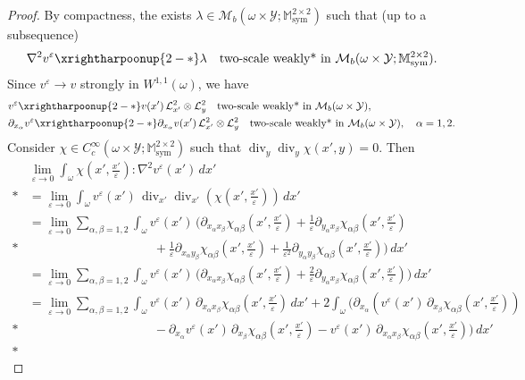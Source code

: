 \documentclass[reqno,10pt]{amsart}
\numberwithin{equation}{section}
\theoremstyle{remark}
\newcommand{\calL}{\mathcal{L}}
\newcommand{\M}{\mathbb{M}}
\newcommand{\R}{\mathbb{R}}
\newcommand{\calY}{\mathcal{Y}}
\DeclareMathOperator{\sym}{sym}
\newcommand{\strong}{\to}
\newcommand{\weakstartwoscale}{\xrightharpoonup{2-*}}
\renewcommand{\div}{\operatorname{div}}
\newcommand{\eps}{\varepsilon}
\newcommand{\Mb}{\mathcal{M}_b}
\newcommand{\D}{\nabla}
\begin{document}
\begin{proof}
By compactness, the exists $\lambda \in \Mb(\omega \times \calY;\M^{2 \times 2}_{\sym})$ such that (up to a subsequence)
\begin{equation*}
	{\D}^2v^\eps \weakstartwoscale \lambda \quad \text{two-scale weakly* in $\Mb(\omega \times \calY;\M^{2 \times 2}_{\sym})$}.
\end{equation*}
Since $v^\eps \strong v$ strongly in $W^{1,1}(\omega)$, we have
\begin{align*}
	& v^\eps \weakstartwoscale v(x') \,\calL^{2}_{x'} \otimes \calL^{2}_{y} \quad \text{two-scale weakly* in $\Mb(\omega \times \calY)$},\\
	& \partial_{x_\alpha}v^\eps \weakstartwoscale \partial_{x_\alpha}v(x') \,\calL^{2}_{x'} \otimes \calL^{2}_{y} \quad \text{two-scale weakly* in $\Mb(\omega \times \calY)$}, \quad \alpha=1,2.
\end{align*}
Consider $\chi \in C_c^{\infty}(\omega \times \calY;\M^{2 \times 2}_{\sym})$ such that $\div_{y}\div_{y}\chi(x',y) = 0$. 
Then
{\allowdisplaybreaks
\begin{align*}
	& \lim_{\eps\to0} \int_{\omega} \chi\left(x',\frac{x'}{\eps}\right) : {\D}^2v^\eps(x') \,dx'\\*
	& = \lim_{\eps\to0} \int_{\omega} v^\eps(x')\,\div_{x'}\div_{x'}\left(\chi\left(x',\frac{x'}{\eps}\right)\right) \,dx'\\ 
	& = \lim_{\eps\to0} \sum_{\alpha,\beta=1,2} \int_{\omega} v^\eps(x')\,\bigg( \partial_{x_\alpha x_\beta}\chi_{\alpha \beta}\left(x',\frac{x'}{\eps}\right) + \frac{1}{\eps}\partial_{y_\alpha x_\beta}\chi_{\alpha \beta}\left(x',\frac{x'}{\eps}\right)\\*\nonumber& \hspace{10em} + \frac{1}{\eps}\partial_{x_\alpha y_\beta}\chi_{\alpha \beta}\left(x',\frac{x'}{\eps}\right) + \frac{1}{\eps^2}\partial_{y_\alpha y_\beta}\chi_{\alpha \beta}\left(x',\frac{x'}{\eps}\right) \bigg) \,dx'\\
	& = \lim_{\eps\to0} \sum_{\alpha,\beta=1,2} \int_{\omega} v^\eps(x')\,\bigg( \partial_{x_\alpha x_\beta}\chi_{\alpha \beta}\left(x',\frac{x'}{\eps}\right) + \frac{2}{\eps}\partial_{y_\alpha x_\beta}\chi_{\alpha \beta}\left(x',\frac{x'}{\eps}\right) \bigg) \,dx'\\
	& = \lim_{\eps\to0} \sum_{\alpha,\beta=1,2} \int_{\omega} v^\eps(x')\,\partial_{x_\alpha x_\beta}\chi_{\alpha \beta}\left(x',\frac{x'}{\eps}\right) \,dx' + 2 \int_{\omega} \bigg( \partial_{x_\alpha}\left( v^\eps(x')\,\partial_{x_\beta}\chi_{\alpha \beta}\left(x',\frac{x'}{\eps}\right) \right)\\*\nonumber& \hspace{10em} - \partial_{x_\alpha}v^\eps(x')\,\partial_{x_\beta}\chi_{\alpha \beta}\left(x',\frac{x'}{\eps}\right) - v^\eps(x')\,\partial_{x_\alpha x_\beta}\chi_{\alpha \beta}\left(x',\frac{x'}{\eps}\right) \bigg) \,dx'\\*

\end{align*}}
\end{proof}
\end{document}
